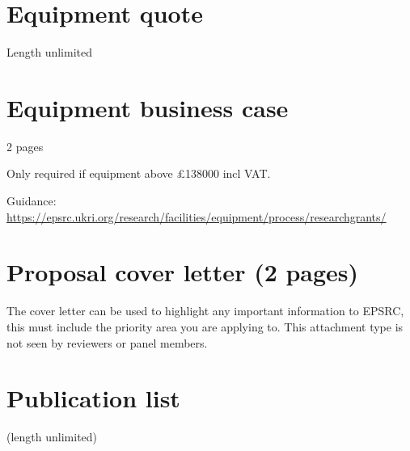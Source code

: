 \documentclass[11pt,a4paper]{report}
\begin{document}
\chapter{Equipment quote}

Length unlimited
\pagebreak

\chapter{Equipment business case}

2 pages

Only required if equipment above £138000 incl VAT.

Guidance: \url{https://epsrc.ukri.org/research/facilities/equipment/process/researchgrants/}
\pagebreak


\pagebreak

\chapter{Proposal cover letter (2 pages)}

The cover letter can be used to highlight any important information to EPSRC,
this must include the priority area you are applying to. This attachment type is
not seen by reviewers or panel members.

\pagebreak

\chapter{Publication list}

(length unlimited)



\pagebreak
\end{document}
